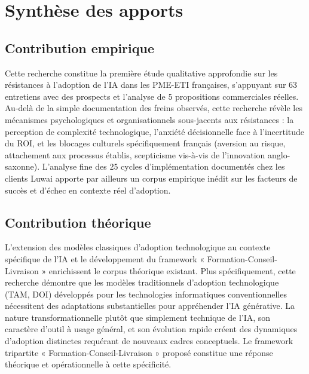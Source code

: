 \chap\section{Synthèse des apports}

\subsection{Contribution empirique}
Cette recherche constitue la première étude qualitative approfondie sur les résistances à l'adoption de l'IA dans les PME-ETI françaises, s'appuyant sur 63 entretiens avec des prospects et l'analyse de 5 propositions commerciales réelles. Au-delà de la simple documentation des freins observés, cette recherche révèle les mécanismes psychologiques et organisationnels sous-jacents aux résistances : la perception de complexité technologique, l'anxiété décisionnelle face à l'incertitude du ROI, et les blocages culturels spécifiquement français (aversion au risque, attachement aux processus établis, scepticisme vis-à-vis de l'innovation anglo-saxonne). L'analyse fine des 25 cycles d'implémentation documentés chez les clients Luwai apporte par ailleurs un corpus empirique inédit sur les facteurs de succès et d'échec en contexte réel d'adoption.

\subsection{Contribution théorique}
L'extension des modèles classiques d'adoption technologique au contexte spécifique de l'IA et le développement du framework « Formation-Conseil-Livraison » enrichissent le corpus théorique existant. Plus spécifiquement, cette recherche démontre que les modèles traditionnels d'adoption technologique (TAM, DOI) développés pour les technologies informatiques conventionnelles nécessitent des adaptations substantielles pour appréhender l'IA générative. La nature transformationnelle plutôt que simplement technique de l'IA, son caractère d'outil à usage général, et son évolution rapide créent des dynamiques d'adoption distinctes requérant de nouveaux cadres conceptuels. Le framework tripartite « Formation-Conseil-Livraison » proposé constitue une réponse théorique et opérationnelle à cette spécificité.

